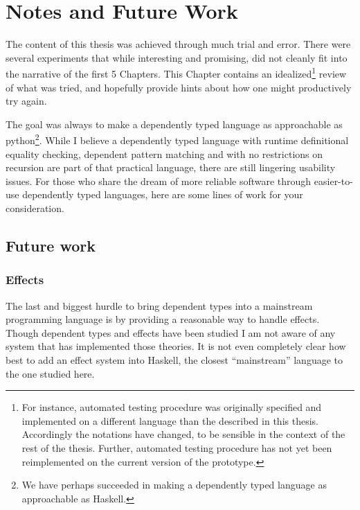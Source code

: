 \chapter{Notes and Future Work}
\label{chapter:Notes}
\thispagestyle{myheadings}
 
The content of this thesis was achieved through much trial and error.
There were several experiments that while interesting and promising, did not cleanly fit into the narrative of the first 5 Chapters.
This Chapter contains an idealized\footnote{
  For instance, automated testing procedure was originally specified and implemented on a different language than the \clang{} described in this thesis.
  Accordingly the notations have changed, to be sensible in the context of the rest of the thesis. %
  Further, automated testing procedure has not yet been reimplemented on the current version of the prototype.
} review of what was tried, and hopefully provide hints about how one might productively try again.
 
The goal was always to make a dependently typed language as approachable as python\footnote{
  We have perhaps succeeded in making a dependently typed language as approachable as Haskell.
}.
While I believe a \fullSp{} dependently typed language with runtime definitional equality checking, dependent pattern matching and with no restrictions on recursion are part of that practical language, there are still lingering usability issues.
For those who share the dream of more reliable software through easier-to-use dependently typed languages, here are some lines of work for your consideration.

 


\section{Future work}


\subsection{Effects}

The last and biggest hurdle to bring dependent types into a mainstream programming language is by providing a reasonable way to handle effects.
Though dependent types and effects have been studied I am not aware of any \fullSp{} system that has implemented those theories.
It is not even completely clear how best to add an effect system into Haskell, the closest ``mainstream'' language to the one studied here.


